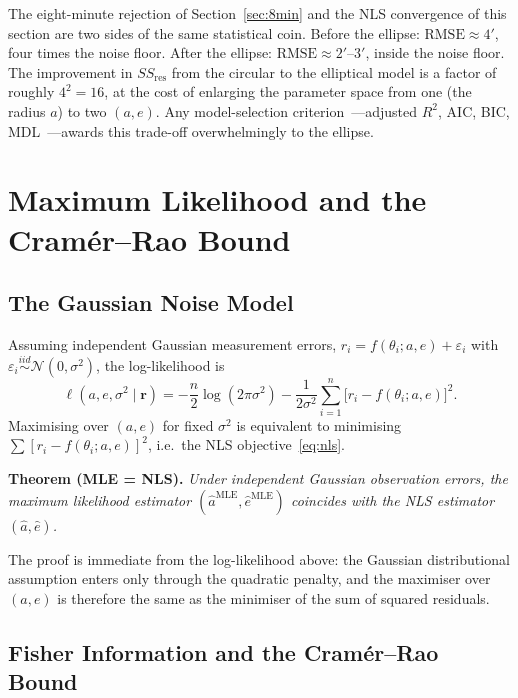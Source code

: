 \documentclass[12pt]{article}
\begin{document}
The eight-minute rejection of Section~\ref{sec:8min} and the NLS convergence
of this section are two sides of the same statistical coin.
Before the ellipse: $\text{RMSE}\approx4'$, four times the noise floor.
After the ellipse: $\text{RMSE}\approx2'$--$3'$, inside the noise floor.
The improvement in $SS_{\text{res}}$ from the circular to the elliptical
model is a factor of roughly $4^{2}=16$, at the cost of enlarging the
parameter space from one (the radius $a$) to two $(a,e)$.
Any model-selection criterion~---adjusted $R^{2}$, AIC, BIC, MDL~---awards
this trade-off overwhelmingly to the ellipse.

\section{Maximum Likelihood and the Cram\'{e}r--Rao Bound}
\label{sec:mle}

\subsection{The Gaussian Noise Model}

Assuming independent Gaussian measurement errors,
$r_{i}= f(\theta_{i};a,e)+\varepsilon_{i}$ with $\varepsilon_{i}
\overset{iid}{\sim}\mathcal{N}(0,\sigma^{2})$, the log-likelihood is
\[
  \ell(a,e,\sigma^{2}\mid\mathbf{r})
  = -\frac{n}{2}\log(2\pi\sigma^{2})
    - \frac{1}{2\sigma^{2}}\sum_{i=1}^{n}\bigl[r_{i}-f(\theta_{i};a,e)\bigr]^{2}.
\]
Maximising over $(a,e)$ for fixed $\sigma^{2}$ is equivalent to minimising
$\sum[r_{i}-f(\theta_{i};a,e)]^{2}$, i.e.\ the NLS objective~\eqref{eq:nls}.

\textbf{Theorem (MLE = NLS).}
\textit{Under independent Gaussian observation errors, the maximum likelihood
estimator $(\hat{a}^{\text{MLE}},\hat{e}^{\text{MLE}})$ coincides with the
NLS estimator $(\hat{a},\hat{e})$.}

The proof is immediate from the log-likelihood above:
the Gaussian distributional assumption enters only through the quadratic
penalty, and the maximiser over $(a,e)$ is therefore the same as the
minimiser of the sum of squared residuals.

\subsection{Fisher Information and the Cram\'{e}r--Rao Bound}
\end{document}
